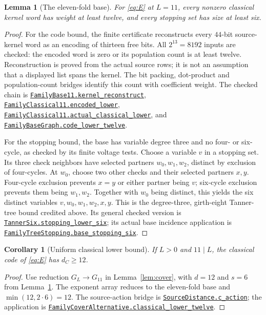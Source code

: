 \documentclass[11pt]{article}
\makeatletter
\newtheorem{lemma}[theorem]{Lemma}
\newtheorem{corollary}[theorem]{Corollary}
\theoremstyle{definition}\newtheorem{definition}[theorem]{Definition}
\newcommand{\proofcommit}{98eb91cd9049e6a88887a5ba79150ad96a4a3e53}
\newcommand{\proofbase}{https://github.com/alectionary/vibe-math/blob/\proofcommit/formalization/distance-preservation}
\newcommand{\lean}[2]{\href{\proofbase/#1.lean\#L\csname leanline@#2\endcsname}{\nolinkurl{#2}}}
\makeatother
\begin{document}
\begin{lemma}[The eleven-fold base]\label{lem:base}
For \eqref{eq:E} at $L=11$, every nonzero classical kernel word has
weight at least twelve, and every stopping set has size at least six.
\end{lemma}
\begin{proof}
For the code bound, the finite certificate reconstructs every
$44$-bit source-kernel word as an encoding of thirteen free bits.
All $2^{13}=8192$ inputs are checked: the encoded word is zero or its
population count is at least twelve. Reconstruction is proved from
the actual source rows; it is not an assumption that a displayed
list spans the kernel. The bit packing, dot-product and population-count
bridges identify this count with coefficient weight.
The checked chain is
\lean{FamilySource11}{FamilyBase11.kernel_reconstruct},
\lean{FamilyDistance11}{FamilyClassical11.encoded_lower},
\lean{FamilyDistance11}{FamilyClassical11.actual_classical_lower}, and
\lean{FamilyBaseDistance}{FamilyBaseGraph.code_lower_twelve}.

For the stopping bound, the base has variable degree three and no
four- or six-cycle, as checked by its finite voltage tests. Choose a
variable $v$ in a stopping set. Its three check neighbors have selected
partners $w_0,w_1,w_2$, distinct by exclusion of four-cycles. At $w_0$,
choose two other checks and their selected partners $x,y$.
Four-cycle exclusion prevents $x=y$ or either partner being $v$;
six-cycle exclusion prevents them being $w_1,w_2$. Together with
$w_0$ being distinct, this yields the six distinct variables
$v,w_0,w_1,w_2,x,y$. This is the degree-three, girth-eight Tanner-tree
bound credited above. Its general checked version is
\lean{TannerSix}{TannerSix.stopping_lower_six}; its actual base
incidence application is
\lean{FamilyTreeStopping}{FamilyTreeStopping.base_stopping_six}.
\end{proof}

\begin{corollary}[Uniform classical lower bound]\label{cor:lower}
If $L>0$ and $11\mid L$, the classical code of \eqref{eq:E} has
$d_C\geq12$.
\end{corollary}
\begin{proof}
Use reduction $G_L\to G_{11}$ in Lemma~\ref{lem:cover}, with
$d=12$ and $s=6$ from Lemma~\ref{lem:base}. The exponent array reduces
to the eleven-fold base and $\min(12,2\cdot6)=12$.
The source-action bridge is
\lean{SourceDistance}{SourceDistance.c_action}; the application is
\lean{FamilyCoverAlternative}{FamilyCoverAlternative.classical_lower_twelve}.
\end{proof}
\end{document}
